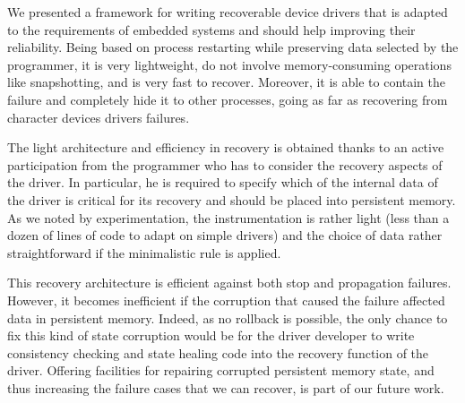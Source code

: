 \documentclass{acm_proc_article-sp}
\begin{document}
We presented a framework for writing recoverable device drivers that is adapted to the requirements of embedded systems and should help improving their reliability. Being based on process restarting while preserving data selected by the programmer, it is very lightweight, do not involve memory-consuming operations like snapshotting, and is very fast to recover. Moreover, it is able to contain the failure and completely hide it to other processes, going as far as recovering from character devices drivers failures.

The light architecture and efficiency in recovery is obtained thanks to an active participation from the programmer who has to consider the recovery aspects of the driver. In particular, he is required to specify which of the internal data of the driver is critical for its recovery and should be placed into persistent memory. As we noted by experimentation, the instrumentation is rather light (less than a dozen of lines of code to adapt on simple drivers) and the choice of data rather straightforward if the minimalistic rule is applied.

This recovery architecture is efficient against both stop and propagation failures. However, it becomes inefficient if the corruption that caused the failure affected data in persistent memory. Indeed, as no rollback is possible, the only chance to fix this kind of state corruption would be for the driver developer to write consistency checking and state healing code into the recovery function of the driver. Offering facilities for repairing corrupted persistent memory state, and thus increasing the failure cases that we can recover, is part of our future work.



\end{document}
